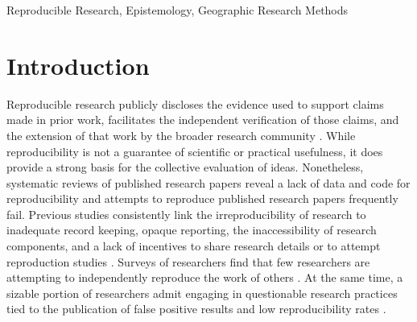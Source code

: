 \documentclass[]{interact}
\theoremstyle{plain}%
\theoremstyle{definition}
\theoremstyle{remark}
\begin{document}
\begin{keywords}
Reproducible Research, Epistemology, Geographic Research Methods
\end{keywords}

\newpage
\section*{Introduction}
Reproducible research publicly discloses the evidence used to support claims made in prior work, facilitates the independent verification of those claims, and the extension of that work by the broader research community \citep{earp2015, nosek2012scientific, Schmidt2009}.
While reproducibility is not a guarantee of scientific or practical usefulness, it does provide a strong basis for the collective evaluation of ideas.
Nonetheless, systematic reviews \citep{moraila2014measuring, iqbal2016reproducible} of published research papers reveal a lack of data and code for reproducibility  and attempts to reproduce published research papers \citep{raghupathi2022reproducibility, chang2015economics} frequently fail.
Previous studies consistently link the irreproducibility of research to inadequate record keeping, opaque reporting, the inaccessibility of research components, and a lack of incentives to share research details or to attempt reproduction studies \citep{ranstam2000fraud, anderson2007normative, NASEM2019}.
Surveys of researchers find that few researchers are attempting to independently reproduce the work of others \citep{baker20161, boulbes2018survey}.
At the same time, a sizable portion of researchers admit engaging in questionable research practices tied to the publication of false positive results and low reproducibility rates \citep{fanelli2009many, fraser2018questionable}.
\end{document}
